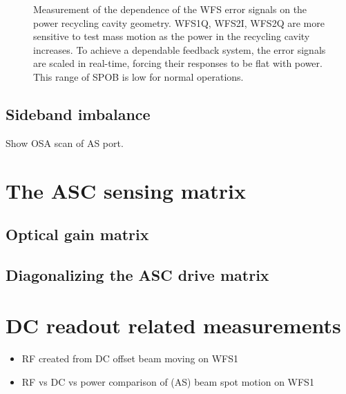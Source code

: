\begin{figure}
\begin{centering}
\caption{Measurement of the dependence of the WFS error signals on the
power recycling cavity geometry. WFS1Q, WFS2I, WFS2Q are more
sensitive to test mass motion as the power in the recycling cavity
increases. To achieve a dependable feedback system, the error signals
are scaled in real-time, forcing their responses to be flat with
power. This range of SPOB is low for normal operations.}
\label{fig:WFStrack}
\end{centering}
\end{figure}


\subsection{Sideband imbalance}
Show OSA scan of AS port.




\section{The ASC sensing matrix}



\subsection{Optical gain matrix}


\subsection{Diagonalizing the ASC drive matrix}




\section{DC readout related measurements}
\begin{itemize}
\item RF created from DC offset beam moving on WFS1
\item RF vs DC vs power comparison of (AS) beam spot motion on WFS1
\end{itemize}






